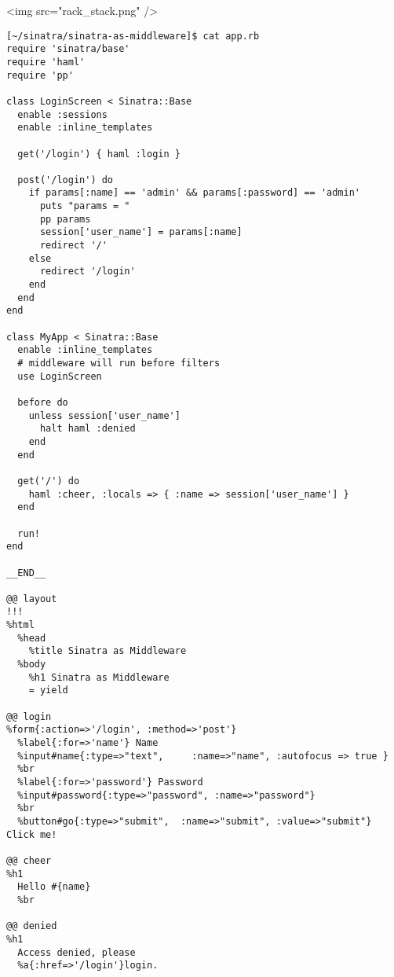 \begin{rawhtml}
<img src="rack_stack.png" />
\end{rawhtml}

\begin{verbatim}
[~/sinatra/sinatra-as-middleware]$ cat app.rb
require 'sinatra/base'
require 'haml'
require 'pp'

class LoginScreen < Sinatra::Base
  enable :sessions
  enable :inline_templates

  get('/login') { haml :login }

  post('/login') do
    if params[:name] == 'admin' && params[:password] == 'admin'
      puts "params = "
      pp params
      session['user_name'] = params[:name]
      redirect '/'
    else
      redirect '/login'
    end
  end
end

class MyApp < Sinatra::Base
  enable :inline_templates
  # middleware will run before filters
  use LoginScreen

  before do
    unless session['user_name']
      halt haml :denied
    end
  end

  get('/') do
    haml :cheer, :locals => { :name => session['user_name'] }
  end

  run!
end

__END__

@@ layout
!!!
%html
  %head
    %title Sinatra as Middleware
  %body
    %h1 Sinatra as Middleware
    = yield

@@ login
%form{:action=>'/login', :method=>'post'}
  %label{:for=>'name'} Name
  %input#name{:type=>"text",     :name=>"name", :autofocus => true }
  %br
  %label{:for=>'password'} Password
  %input#password{:type=>"password", :name=>"password"}
  %br
  %button#go{:type=>"submit",  :name=>"submit", :value=>"submit"} Click me!

@@ cheer
%h1
  Hello #{name}
  %br

@@ denied
%h1 
  Access denied, please 
  %a{:href=>'/login'}login.
\end{verbatim}
